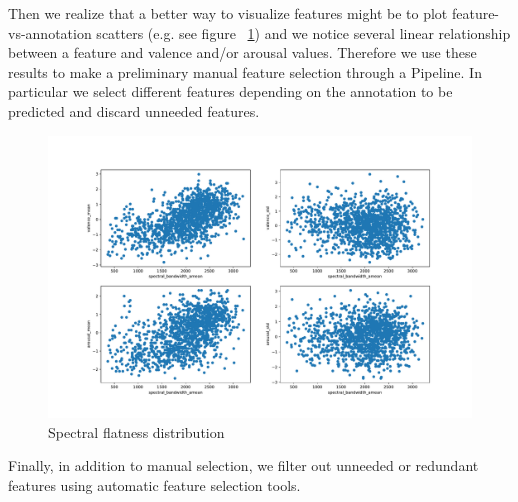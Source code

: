 Then we realize that a better way to visualize features might be to plot feature-vs-annotation scatters (e.g. see figure ~\ref{fig:scatter-spectral_bandwidth_amean}) and we notice several linear relationship between a feature and valence and/or arousal values. Therefore we use these results to make a preliminary manual feature selection through a Pipeline. In particular we select different features depending on the annotation to be predicted and discard unneeded features.

\begin{figure}
	\centering
	\includegraphics[width=0.9\linewidth]{assets/scatter-spectral_bandwidth_amean.pdf}
	\caption{Spectral flatness distribution}
	\label{fig:scatter-spectral_bandwidth_amean}
\end{figure}

Finally, in addition to manual selection, we filter out unneeded or redundant features using automatic feature selection tools.